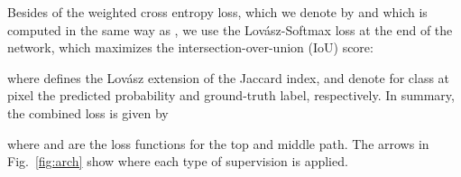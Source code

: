 \documentclass[letterpaper, 10 pt, journal, twoside]{ieeetran}
\newcommand{\figref}[1]{Fig.~\ref{#1}}
\newcommand{\todo}[1]{#1}
\begin{document}
Besides of the weighted cross entropy loss, which we denote by  and which is computed in the same way as , we use the Lov\'asz-Softmax loss  \cite{berman2018lovasz} at the end of the network, which maximizes the intersection-over-union (IoU) score:


where  defines the Lov\'asz extension of the Jaccard index,   and   denote for class  at pixel  the predicted probability and ground-truth label, respectively.
In summary, the combined loss is given by

where  and  are the loss functions for the top and middle path. 
\todo{The arrows in \figref{fig:arch} show where each type of supervision is applied.}


\begin{table}[t]
    \centering
    \renewcommand{\tabcolsep}{1.6mm}
    \caption{Ablation study for different blocks of each path.}
    \label{tab:ablation_block}
    \vspace{-6mm}
\end{table}
\end{document}
